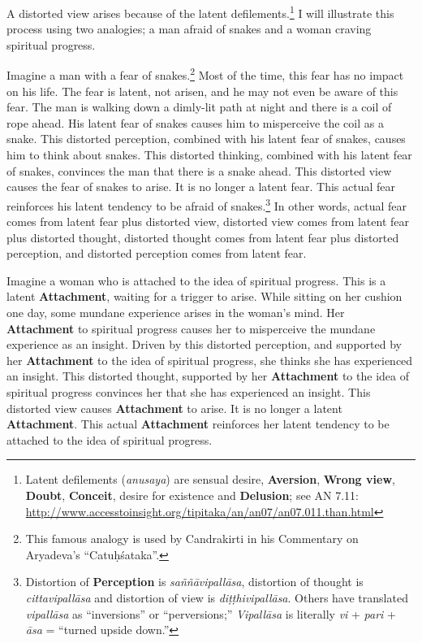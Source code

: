 A distorted view arises because of the latent defilements.\footnote{Latent defilements (\textit{anusaya}) are sensual desire, \textbf{Aversion}, \textbf{Wrong view}, \textbf{Doubt}, \textbf{Conceit}, desire for existence and \textbf{Delusion}; see AN 7.11: \url{http://www.accesstoinsight.org/tipitaka/an/an07/an07.011.than.html}} I will illustrate this process using two analogies; a man afraid of snakes and a woman craving spiritual progress.

\pagebreak

Imagine a man with a fear of snakes.\footnote{This famous analogy is used by Candrakirti in his Commentary on Aryadeva’s “Catuḥśataka”.} Most of the time, this fear has no impact on his life. The fear is latent, not arisen, and he may not even be aware of this fear. The man is walking down a dimly-lit path at night and there is a coil of rope ahead. His latent fear of snakes causes him to misperceive the coil as a snake. This distorted perception, combined with his latent fear of snakes, causes him to think about snakes. This distorted thinking, combined with his latent fear of snakes, convinces the man that there is a snake ahead. This distorted view causes the fear of snakes to arise. It is no longer a latent fear. This actual fear reinforces his latent tendency to be afraid of snakes.\footnote{Distortion of \textbf{Perception} is \textit{saññāvipallāsa}, distortion of thought is \textit{cittavipallāsa} and distortion of view is \textit{diṭṭhivipallāsa}. Others have translated \textit{vipallāsa} as “inversions” or “perversions;” \textit{Vipallāsa} is literally \textit{vi} + \textit{pari} + \textit{āsa} = “turned upside down.”} In other words, actual fear comes from latent fear plus distorted view, distorted view comes from latent fear plus distorted thought, distorted thought comes from latent fear plus distorted perception, and distorted perception comes from latent fear.

Imagine a woman who is attached to the idea of spiritual progress. This is a latent \textbf{Attachment}, waiting for a trigger to arise. While sitting on her cushion one day, some mundane experience arises in the woman’s mind. Her \textbf{Attachment} to spiritual progress causes her to misperceive the mundane experience as an insight. Driven by this distorted perception, and supported by her \textbf{Attachment} to the idea of spiritual progress, she thinks she has experienced an insight. This distorted thought, supported by her \textbf{Attachment} to the idea of spiritual progress convinces her that she has experienced an insight. This distorted view causes \textbf{Attachment} to arise. It is no longer a latent \textbf{Attachment}. This actual \textbf{Attachment} reinforces her latent tendency to be attached to the idea of spiritual progress.


